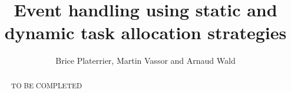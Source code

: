 \documentclass[a4paper, 10pt, conference]{ieeeconf}      %
\title{\LARGE \bf
Event handling using static and dynamic task allocation strategies
}
\author{Brice Platerrier, Martin Vassor and Arnaud Wald}
\begin{document}
\maketitle
\thispagestyle{empty}
\pagestyle{empty}

\begin{abstract}

TO BE COMPLETED

\end{abstract}











\printbibliography
\end{document}
